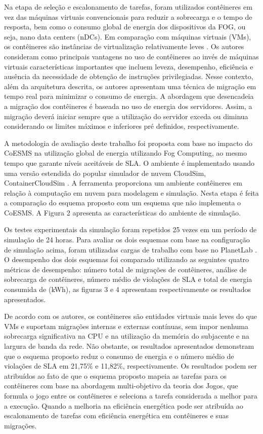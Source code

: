 Na etapa de seleção e escalonamento de tarefas, foram utilizados contêineres em vez das máquinas virtuais convencionais para reduzir a sobrecarga e o tempo de resposta, bem como o consumo global de energia dos dispositivos da FOG, ou seja, nano data centers (nDCs). Em comparação com máquinas virtuais (VMs), os contêineres são instâncias de virtualização relativamente leves \cite{pahl2015containers,pahl2015containerization}. Os autores consideram como principais vantagens no uso de contêineres ao invés de máquinas virtuais características importantes que incluem leveza, desempenho, eficiência e ausência da necessidade de obtenção de instruções privilegiadas. Nesse contexto, além da arquitetura descrita, os autores apresentam uma técnica de migração em tempo real para minimizar o consumo de energia. A abordagem que desencadeia a migração dos contêineres é baseada no uso de energia dos servidores. Assim, a migração deverá iniciar sempre que a utilização do servidor exceda ou diminua considerando os limites máximos e inferiores pré definidos, respectivamente. 

A metodologia de avaliação deste trabalho foi proposta com base no impacto do CoESMS na utilização global de energia utilizando Fog Computing, ao mesmo tempo que garante níveis aceitáveis de SLA. O ambiente é implementado usando uma versão estendida do popular simulador de nuvem CloudSim, ContainerCloudSim \cite{piraghaj2017containercloudsim}. A ferramenta proporciona um ambiente contêineres em relação à computação em nuvem para modelagem e simulação. Nesta etapa é feita a comparação do esquema proposto com um esquema que não implementa o CoESMS. A Figura 2 apresenta as características do ambiente de simulação.



Os testes experimentais da simulação foram repetidos 25 vezes em um período de simulação de 24 horas. Para avaliar os dois esquemas com base na configuração de simulação acima, foram utilizadas cargas de trabalho com base no PlanetLab \cite{chun2003planetlab}. O desempenho dos dois esquemas foi comparado utilizando as seguintes quatro métricas de desempenho: número total de migrações de contêineres, análise de sobrecarga de contêineres, número médio de violações de SLA e total de energia consumida de (kWh), as figuras 3 e 4 apresentam respectivamente os resultados apresentados.



De acordo com os autores, os contêineres são entidades virtuais mais leves do que VMs e suportam migrações internas e externas contínuas, sem impor nenhuma sobrecarga significativa na CPU e na utilização da memória do subjacente e na largura de banda da rede. Não obstante, os resultados apresentados demonstram que o esquema proposto reduz o consumo de energia e o número médio de violações de SLA em 21,75\% e 11,82\%, respectivamente. Os resultados podem ser atribuídos ao fato de que o esquema proposto mapeia as tarefas para os contêineres com base na abordagem multi-objetivo da teoria dos Jogos, que formula o jogo entre os contêineres e seleciona a tarefa considerada a melhor para a execução. Quando a melhoria na eficiência energética pode ser atribuída ao escalonamento de tarefas com eficiência energética em contêineres e suas migrações.

